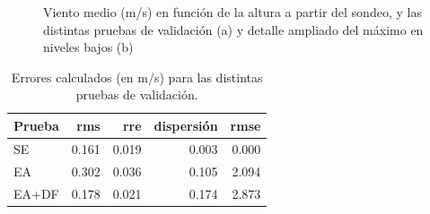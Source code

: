 \documentclass[12pt,spanish,oneside, a4paper]{book}
\begin{document}
\begin{figure}

{\centering {}

}

\caption{Viento medio (m/s) en función de la altura a partir del sondeo, y las distintas pruebas de validación (a) y detalle ampliado del máximo en niveles bajos (b) \label{validacion-perfiles}}\label{fig:validacion-perfiles}
\end{figure}

\begin{table}

\caption{\label{tab:validacion-errores}Errores calculados (en m/s) para las distintas pruebas de validación. \label{validacion-errores}}
\centering
\begin{tabular}[t]{lrrrr}
\toprule
Prueba & rms & rre & dispersión & rmse\\
\midrule
SE & 0.161 & 0.019 & 0.003 & 0.000\\
EA & 0.302 & 0.036 & 0.105 & 2.094\\
EA+DF & 0.178 & 0.021 & 0.174 & 2.873\\
\bottomrule
\end{tabular}
\end{table}
\end{document}
